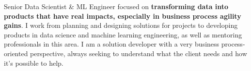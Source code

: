 

\begin{cvparagraph}

Senior Data Scientist \& ML Engineer focused on \textbf{transforming data into products that have real impacts, especially in business process agility gains}. I work from planning and designing solutions for projects to developing products in data science and machine learning engineering, as well as mentoring professionals in this area. I am a solution developer with a very business process-oriented perspective, always seeking to understand what the client needs and how it's possible to help.


\end{cvparagraph}

